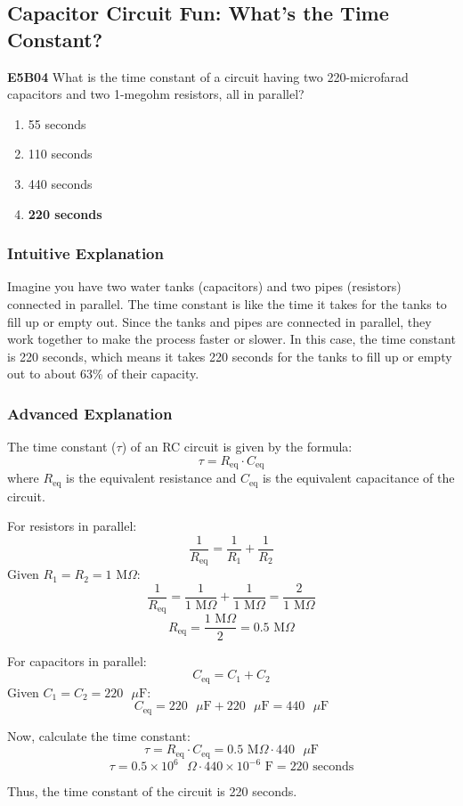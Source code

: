 \subsection{Capacitor Circuit Fun: What's the Time Constant?}

\begin{tcolorbox}[colback=gray!10!white,colframe=black!75!black,title=Multiple Choice Question]
\textbf{E5B04} What is the time constant of a circuit having two 220-microfarad capacitors and two 1-megohm resistors, all in parallel?

\begin{enumerate}[label=\Alph*.]
    \item 55 seconds
    \item 110 seconds
    \item 440 seconds
    \item \textbf{220 seconds}
\end{enumerate}
\end{tcolorbox}

\subsubsection*{Intuitive Explanation}
Imagine you have two water tanks (capacitors) and two pipes (resistors) connected in parallel. The time constant is like the time it takes for the tanks to fill up or empty out. Since the tanks and pipes are connected in parallel, they work together to make the process faster or slower. In this case, the time constant is 220 seconds, which means it takes 220 seconds for the tanks to fill up or empty out to about 63\% of their capacity.

\subsubsection*{Advanced Explanation}
The time constant (\(\tau\)) of an RC circuit is given by the formula:
\[
\tau = R_{\text{eq}} \cdot C_{\text{eq}}
\]
where \(R_{\text{eq}}\) is the equivalent resistance and \(C_{\text{eq}}\) is the equivalent capacitance of the circuit.

For resistors in parallel:
\[
\frac{1}{R_{\text{eq}}} = \frac{1}{R_1} + \frac{1}{R_2}
\]
Given \(R_1 = R_2 = 1 \text{ M}\Omega\):
\[
\frac{1}{R_{\text{eq}}} = \frac{1}{1 \text{ M}\Omega} + \frac{1}{1 \text{ M}\Omega} = \frac{2}{1 \text{ M}\Omega}
\]
\[
R_{\text{eq}} = \frac{1 \text{ M}\Omega}{2} = 0.5 \text{ M}\Omega
\]

For capacitors in parallel:
\[
C_{\text{eq}} = C_1 + C_2
\]
Given \(C_1 = C_2 = 220 \text{ }\mu\text{F}\):
\[
C_{\text{eq}} = 220 \text{ }\mu\text{F} + 220 \text{ }\mu\text{F} = 440 \text{ }\mu\text{F}
\]

Now, calculate the time constant:
\[
\tau = R_{\text{eq}} \cdot C_{\text{eq}} = 0.5 \text{ M}\Omega \cdot 440 \text{ }\mu\text{F}
\]
\[
\tau = 0.5 \times 10^6 \text{ }\Omega \cdot 440 \times 10^{-6} \text{ F} = 220 \text{ seconds}
\]

Thus, the time constant of the circuit is 220 seconds.

